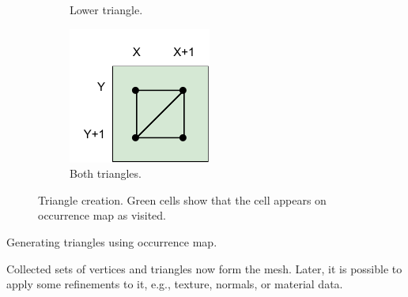 \begin{figure}[ht]
\begin{subfigure}{0.3\textwidth}
        \caption{Lower triangle.}
        \label{fig:triangle_generation:lower}
    \end{subfigure}
    \begin{subfigure}{0.3\textwidth}
        \includegraphics[width=\textwidth]{triangles-full.pdf}
        \caption{Both triangles.}
    \end{subfigure}
    
    \caption{Triangle creation. Green cells show that the cell appears on occurrence map as visited.}
    \label{fig:triangle_generation}
\end{figure}

\begin{algorithm}
    \caption{Generating triangles using occurrence map.}

\end{algorithm}

Collected sets of vertices and triangles now form the mesh. Later, it is possible to apply some refinements to it, e.g., texture, normals, or material data.

